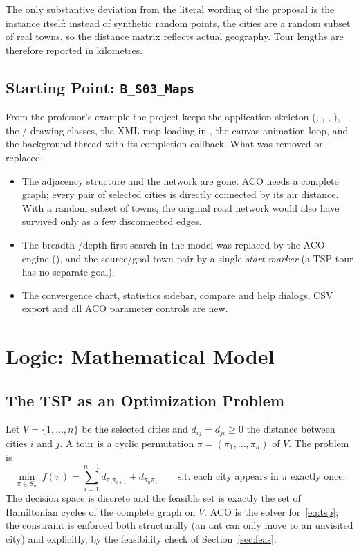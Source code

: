 \documentclass[11pt,a4paper]{article}
\begin{document}
The only substantive deviation from the literal wording of the proposal is the instance itself:
instead of synthetic random points, the cities are a random subset of real towns, so the distance
matrix reflects actual geography. Tour lengths are therefore reported in kilometres.

\subsection{Starting Point: \texttt{B\_S03\_Maps}}
From the professor's example the project keeps the application skeleton (,
, , ), the / drawing classes, the
XML map loading in , the canvas animation loop, and the background thread with its
completion callback. What was removed or replaced:
\begin{itemize}
  \item The  adjacency structure and the  network are gone. ACO needs a complete
        graph; every pair of selected cities is directly connected by its air distance. With a random
        subset of towns, the original road network would also have survived only as a few disconnected
        edges.
  \item The breadth-/depth-first search in the model was replaced by the ACO engine
        (), and the source/goal town pair by a single \emph{start marker} (a TSP tour
        has no separate goal).
  \item The convergence chart, statistics sidebar, compare and help dialogs, CSV export and all ACO
        parameter controls are new.
\end{itemize}

\section{Logic: Mathematical Model}

\subsection{The TSP as an Optimization Problem}
Let $V=\{1,\dots,n\}$ be the selected cities and $d_{ij}=d_{ji}\ge 0$ the distance between cities $i$ and
$j$. A tour is a cyclic permutation $\pi=(\pi_1,\dots,\pi_n)$ of $V$. The problem is
\begin{equation}
\min_{\pi\in S_n}\; f(\pi)=\sum_{i=1}^{n-1} d_{\pi_i\pi_{i+1}} + d_{\pi_n\pi_1}
\qquad\text{s.t. each city appears in }\pi\text{ exactly once.}
\label{eq:tsp}
\end{equation}
The decision space is discrete and the feasible set is exactly the set of Hamiltonian cycles of the
complete graph on $V$. ACO is the solver for~\eqref{eq:tsp}; the constraint is enforced both
structurally (an ant can only move to an unvisited city) and explicitly, by the feasibility check of
Section~\ref{sec:feas}.
\end{document}
